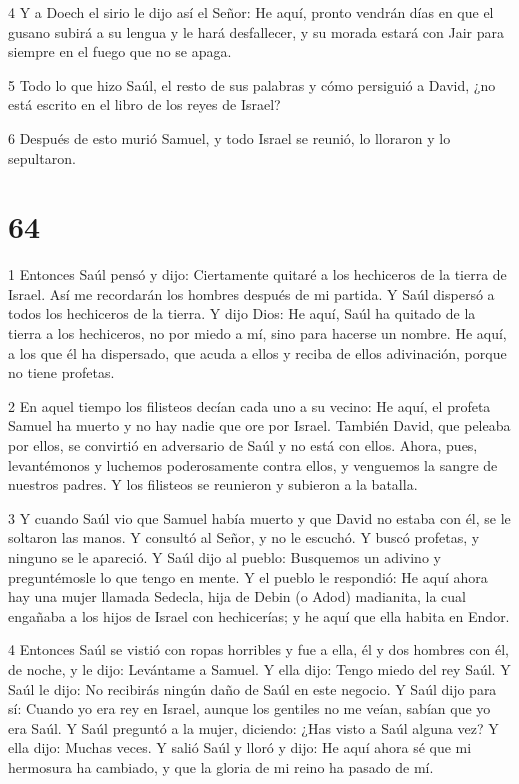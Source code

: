 \par 4 Y a Doech el sirio le dijo así el Señor: He aquí, pronto vendrán días en que el gusano subirá a su lengua y le hará desfallecer, y su morada estará con Jair para siempre en el fuego que no se apaga.

\par 5 Todo lo que hizo Saúl, el resto de sus palabras y cómo persiguió a David, ¿no está escrito en el libro de los reyes de Israel?

\par 6 Después de esto murió Samuel, y todo Israel se reunió, lo lloraron y lo sepultaron.

\chapter{64}

\par 1 Entonces Saúl pensó y dijo: Ciertamente quitaré a los hechiceros de la tierra de Israel. Así me recordarán los hombres después de mi partida. Y Saúl dispersó a todos los hechiceros de la tierra. Y dijo Dios: He aquí, Saúl ha quitado de la tierra a los hechiceros, no por miedo a mí, sino para hacerse un nombre. He aquí, a los que él ha dispersado, que acuda a ellos y reciba de ellos adivinación, porque no tiene profetas.

\par 2 En aquel tiempo los filisteos decían cada uno a su vecino: He aquí, el profeta Samuel ha muerto y no hay nadie que ore por Israel. También David, que peleaba por ellos, se convirtió en adversario de Saúl y no está con ellos. Ahora, pues, levantémonos y luchemos poderosamente contra ellos, y venguemos la sangre de nuestros padres. Y los filisteos se reunieron y subieron a la batalla.

\par 3 Y cuando Saúl vio que Samuel había muerto y que David no estaba con él, se le soltaron las manos. Y consultó al Señor, y no le escuchó. Y buscó profetas, y ninguno se le apareció. Y Saúl dijo al pueblo: Busquemos un adivino y preguntémosle lo que tengo en mente. Y el pueblo le respondió: He aquí ahora hay una mujer llamada Sedecla, hija de Debin (o Adod) madianita, la cual engañaba a los hijos de Israel con hechicerías; y he aquí que ella habita en Endor.

\par 4 Entonces Saúl se vistió con ropas horribles y fue a ella, él y dos hombres con él, de noche, y le dijo: Levántame a Samuel. Y ella dijo: Tengo miedo del rey Saúl. Y Saúl le dijo: No recibirás ningún daño de Saúl en este negocio. Y Saúl dijo para sí: Cuando yo era rey en Israel, aunque los gentiles no me veían, sabían que yo era Saúl. Y Saúl preguntó a la mujer, diciendo: ¿Has visto a Saúl alguna vez? Y ella dijo: Muchas veces. Y salió Saúl y lloró y dijo: He aquí ahora sé que mi hermosura ha cambiado, y que la gloria de mi reino ha pasado de mí.

